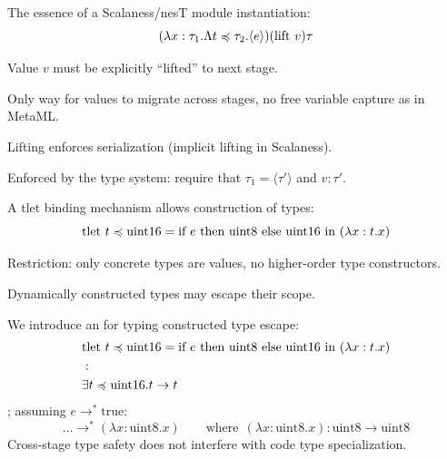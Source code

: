 
The essence of a Scalaness/nesT module instantiation:
{\Large
$$
(\lambda x : \tau_1 . \Lambda t \preccurlyeq \tau_2 . \langle e \rangle)(\mathrm{lift}\ v) \tau
$$
}
\begin{citemize}
\item Value $v$ must be explicitly ``lifted'' to next stage.
\begin{citemize}
\item Only way for values to migrate across stages, no free variable capture as in 
MetaML.
\item Lifting enforces serialization (implicit lifting in Scalaness).
\item Enforced by the type system: require that $\tau_1 = 
\langle \tau' \rangle$ and $v : \tau'$.
\end{citemize}
\end{citemize}
\stopslide


A $\mathrm{tlet}$ binding mechanism allows construction of types:
{\large
$$
\mathrm{tlet\ } t \preccurlyeq \mathrm{uint16} = \text{if }e \text{ then } \mathrm{uint8} \text{ else } \mathrm{uint16} 
\mathrm{\ in\ }(\lambda x : t . x)\\
$$
}
\begin{citemize}
\item Restriction: only concrete types are values, no higher-order type constructors.
\item Dynamically constructed types may escape their scope.
\end{citemize}

\stopslide


We introduce an  for typing constructed type escape:
{\large
\begin{eqnarray*}
&\mathrm{tlet\ } t \preccurlyeq \mathrm{uint16} = \text{if }e \text{ then } \mathrm{uint8} \text{ else } \mathrm{uint16} 
\mathrm{\ in\ }(\lambda x : t . x)\\
&: \\
&\exists t \preccurlyeq \mathrm{uint16} . t \rightarrow t
\end{eqnarray*}
}
; assuming $e \rightarrow^* \mathrm{true}$:
{\large
$$
\ldots \rightarrow^* (\lambda x : \mathrm{uint8} . x) 
\qquad \text{where} \ \ (\lambda x : \mathrm{uint8} . x) : \mathrm{uint8} \rightarrow
 \mathrm{uint8}
$$
}
Cross-stage type safety does not interfere with code type specialization.
\stopslide

